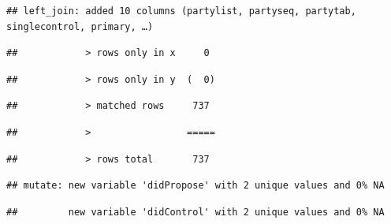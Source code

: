 \documentclass[]{article}
\newenvironment{Shaded}{\begin{snugshade}}{\end{snugshade}}
\newcommand{\DataTypeTok}[1]{\textcolor[rgb]{0.13,0.29,0.53}{#1}}
\newcommand{\DecValTok}[1]{\textcolor[rgb]{0.00,0.00,0.81}{#1}}
\newcommand{\KeywordTok}[1]{\textcolor[rgb]{0.13,0.29,0.53}{\textbf{#1}}}
\newcommand{\NormalTok}[1]{#1}
\newcommand{\OperatorTok}[1]{\textcolor[rgb]{0.81,0.36,0.00}{\textbf{#1}}}
\newcommand{\StringTok}[1]{\textcolor[rgb]{0.31,0.60,0.02}{#1}}
\begin{document}
\begin{verbatim}
## left_join: added 10 columns (partylist, partyseq, partytab, singlecontrol, primary, …)
\end{verbatim}

\begin{verbatim}
##            > rows only in x     0
\end{verbatim}

\begin{verbatim}
##            > rows only in y  (  0)
\end{verbatim}

\begin{verbatim}
##            > matched rows     737
\end{verbatim}

\begin{verbatim}
##            >                 =====
\end{verbatim}

\begin{verbatim}
##            > rows total       737
\end{verbatim}

\begin{Shaded}
\end{Shaded}

\begin{verbatim}
## mutate: new variable 'didPropose' with 2 unique values and 0% NA
\end{verbatim}

\begin{verbatim}
##         new variable 'didControl' with 2 unique values and 0% NA
\end{verbatim}

\begin{Shaded}
\end{Shaded}
\end{document}

